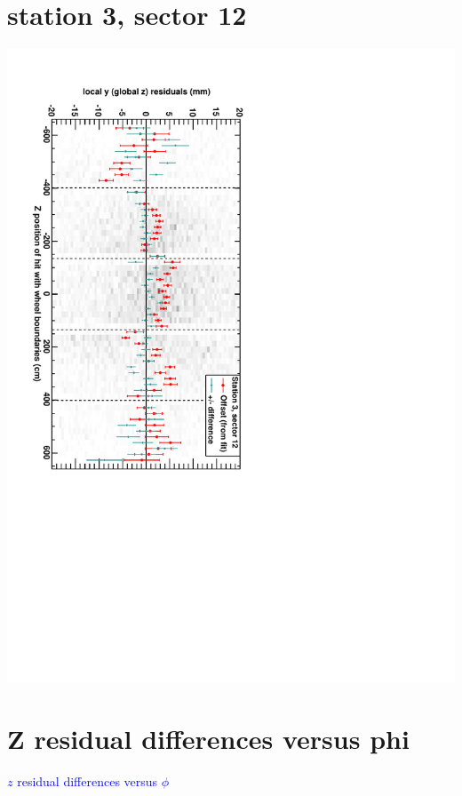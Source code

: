 \documentclass[compress]{beamer}
\begin{document}
\section*{station 3, sector 12}
\begin{frame} \vfill \mbox{\hspace{-1 cm}\includegraphics[height=1.2\linewidth, angle=90]{DTzVsZ_st3_sr12.pdf}} \end{frame}

\section*{Z residual differences versus phi}
\begin{frame}
\begin{center}
\Huge \textcolor{blue}{$z$ residual differences versus $\phi$}
\end{center}
\end{frame}
\end{document}
